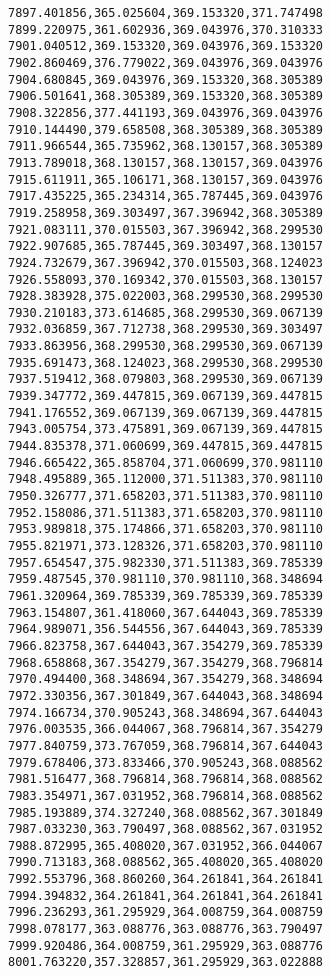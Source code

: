 \documentclass[11pt]{article}
\begin{document}
\begin{Verbatim}[commandchars=\\\{\}]
7897.401856,365.025604,369.153320,371.747498
7899.220975,361.602936,369.043976,370.310333
7901.040512,369.153320,369.043976,369.153320
7902.860469,376.779022,369.043976,369.043976
7904.680845,369.043976,369.153320,368.305389
7906.501641,368.305389,369.153320,368.305389
7908.322856,377.441193,369.043976,369.043976
7910.144490,379.658508,368.305389,368.305389
7911.966544,365.735962,368.130157,368.305389
7913.789018,368.130157,368.130157,369.043976
7915.611911,365.106171,368.130157,369.043976
7917.435225,365.234314,365.787445,369.043976
7919.258958,369.303497,367.396942,368.305389
7921.083111,370.015503,367.396942,368.299530
7922.907685,365.787445,369.303497,368.130157
7924.732679,367.396942,370.015503,368.124023
7926.558093,370.169342,370.015503,368.130157
7928.383928,375.022003,368.299530,368.299530
7930.210183,373.614685,368.299530,369.067139
7932.036859,367.712738,368.299530,369.303497
7933.863956,368.299530,368.299530,369.067139
7935.691473,368.124023,368.299530,368.299530
7937.519412,368.079803,368.299530,369.067139
7939.347772,369.447815,369.067139,369.447815
7941.176552,369.067139,369.067139,369.447815
7943.005754,373.475891,369.067139,369.447815
7944.835378,371.060699,369.447815,369.447815
7946.665422,365.858704,371.060699,370.981110
7948.495889,365.112000,371.511383,370.981110
7950.326777,371.658203,371.511383,370.981110
7952.158086,371.511383,371.658203,370.981110
7953.989818,375.174866,371.658203,370.981110
7955.821971,373.128326,371.658203,370.981110
7957.654547,375.982330,371.511383,369.785339
7959.487545,370.981110,370.981110,368.348694
7961.320964,369.785339,369.785339,369.785339
7963.154807,361.418060,367.644043,369.785339
7964.989071,356.544556,367.644043,369.785339
7966.823758,367.644043,367.354279,369.785339
7968.658868,367.354279,367.354279,368.796814
7970.494400,368.348694,367.354279,368.348694
7972.330356,367.301849,367.644043,368.348694
7974.166734,370.905243,368.348694,367.644043
7976.003535,366.044067,368.796814,367.354279
7977.840759,373.767059,368.796814,367.644043
7979.678406,373.833466,370.905243,368.088562
7981.516477,368.796814,368.796814,368.088562
7983.354971,367.031952,368.796814,368.088562
7985.193889,374.327240,368.088562,367.301849
7987.033230,363.790497,368.088562,367.031952
7988.872995,365.408020,367.031952,366.044067
7990.713183,368.088562,365.408020,365.408020
7992.553796,368.860260,364.261841,364.261841
7994.394832,364.261841,364.261841,364.261841
7996.236293,361.295929,364.008759,364.008759
7998.078177,363.088776,363.088776,363.790497
7999.920486,364.008759,361.295929,363.088776
8001.763220,357.328857,361.295929,363.022888

\end{Verbatim}
\end{document}
